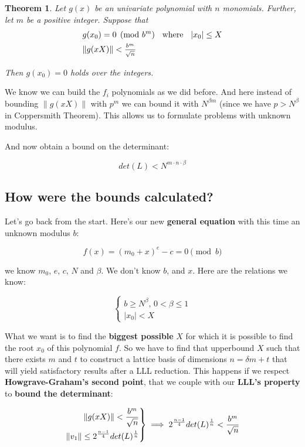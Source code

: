 \documentclass[a4paper,11pt]{article}
\newenvironment{rcases}
  {\left.\begin{aligned}}
  {\end{aligned}\right\rbrace}
\newtheorem{theorem}{Theorem}
\begin{document}
\begin{theorem}
Let $g(x)$ be an univariate polynomial with $n$ monomials. Further, let $m$ be a positive integer. Suppose that
\setcounter{equation}{0}
\begin{align}
&g(x_0) = 0 \pmod{b^m} \hspace{2mm} \text{ where } \hspace{2mm} |x_0| \leq X\\
&\|g(xX)\| < \frac{_{b^m}}{^{\sqrt{n}}}
\end{align}

Then $g(x_0)=0$ holds over the integers.
\end{theorem}

We know we can build the $f_i$ polynomials as we did before. And here instead of bounding $\|g(xX)\|$ with $p^m$ we can bound it with $N^{\beta m}$ (since we have $p > N^\beta$ in Coppersmith Theorem). This allows us to formulate problems with unknown modulus.

And now obtain a bound on the determinant:

\[ det(L) < N^{m \cdot n \cdot \beta} \]

\subsection{How were the bounds calculated?}\label{bounds}

Let's go back from the start. Here's our new \textbf{general equation} with this time an unknown modulus $b$:

\[ f(x) = (m_0 + x)^e - c = 0 \pmod{b} \]

we know $m_0$, $e$, $c$, $N$ and $\beta$. We don't know $b$, and $x$. Here are the relations we know:

\[ \begin{cases} 
	b \geq N^\beta \text{, } 0 < \beta \leq 1 \\
	|x_0| < X
	\end{cases} \]
	
What we want is to find the \textbf{biggest possible} $X$ for which it is possible to find the root $x_0$ of this polynomial $f$.
So we have to find that upperbound $X$ such that there exists $m$ and $t$ to construct a lattice basis of dimensions $n = \delta m + t$ that will yield satisfactory results after a LLL reduction. This happens if we respect \textbf{Howgrave-Graham's  second point}, that we couple with our \textbf{LLL's property} to \textbf{bound the determinant}:

\[
	\begin{rcases}
		\|g(xX)\| < \frac{b^m}{\sqrt{n}}\\
		\|v_1\| \leq 2^{\frac{n-1}{4}}det(L)^{\frac{1}{n}}
	\end{rcases}
	\implies 2^{\frac{n-1}{4}}det(L)^{\frac{1}{n}} < \frac{b^m}{\sqrt{n}}
\]
\end{document}
